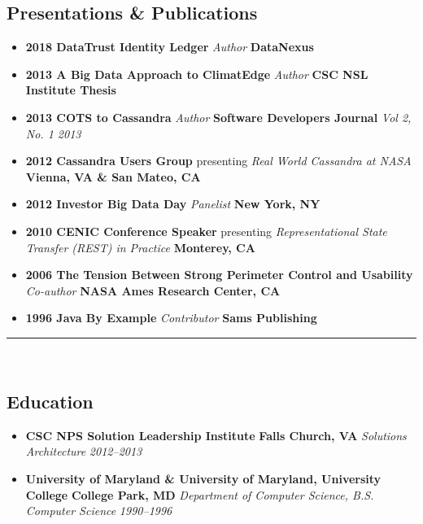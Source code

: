 \subsection*{Presentations \& Publications}

\begin{itemize}
    \parskip=0.1em
    \item
    \headerrow
        {\textbf{2018 DataTrust Identity Ledger} {\emph{Author}} }
        {\textbf{DataNexus}}
 
    \item
    \headerrow
        {\textbf{2013 A Big Data Approach to ClimatEdge\texttrademark} {\emph{Author}}}
        {\textbf{CSC NSL Institute Thesis}}

    \item
	\headerrow
		{\textbf{2013 COTS to Cassandra} {\emph{Author}}}
		{\textbf{Software Developers Journal} {\emph{Vol 2, No. 1 2013}}}
		
    \item
	\headerrow
		{\textbf{2012 Cassandra Users Group} presenting {\emph{Real World Cassandra at NASA}}}
		{\textbf{Vienna, VA \& San Mateo, CA}}

	\item
	\headerrow
		{\textbf{2012 Investor Big Data Day} {\emph{Panelist}}}
		{\textbf{New York, NY}}
	
	\item
    \headerrow
		{\textbf{2010 CENIC Conference Speaker} presenting {\emph{Representational State Transfer (REST) in Practice}}}
		{\textbf{Monterey, CA}}
    
	\item
	\headerrow
		{\textbf{2006 The Tension Between Strong Perimeter Control and Usability} {\emph{Co-author}}}
		{\textbf{NASA Ames Research Center, CA}}

	\item
	\headerrow
		{\textbf{1996 Java By Example} {\emph{Contributor}}}
		{\textbf{Sams Publishing}}

\end{itemize}

%     

\hrule\
\vspace{-0.4em}
\subsection*{Education}

\begin{itemize}
	\parskip=0.1em

	\item
	\headerrow
		{\textbf{CSC NPS Solution Leadership Institute}}
		{\textbf{Falls Church, VA}}
	\headerrow
		{\emph{Solutions Architecture}}
		{\emph{2012--2013}}
	
	\item
	\headerrow
		{\textbf{University of Maryland \& University of Maryland, University College}}
		{\textbf{College Park, MD}}
	\headerrow
		{\emph{Department of Computer Science, B.S. Computer Science}}
		{\emph{1990--1996}}
	
\end{itemize}
